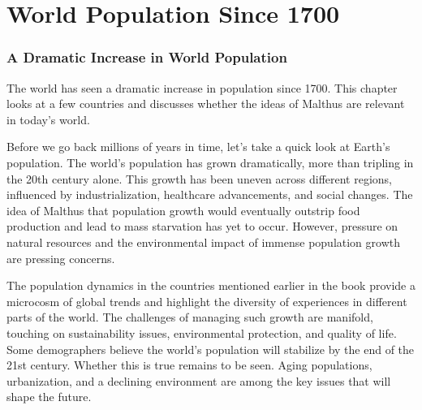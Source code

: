 \documentclass{book}
\newcommand{\inputtoc}[1]{}
\begin{document}
\chapter{World Population Since 1700}
\subsection*{A Dramatic Increase in World Population}
The world has seen a dramatic increase in population since 1700. This chapter looks at a few countries and discusses whether the ideas of Malthus are relevant in today's world.

\let\oldsection\section
\renewcommand{\section}[1]{\oldsection*{#1}\addcontentsline{toc}{section}{#1}}



Before we go back millions of years in time, let's take a quick look at Earth's population. The world's population has grown dramatically, more than tripling in the 20th century alone. This growth has been uneven across different regions, influenced by industrialization, healthcare advancements, and social changes. The idea of Malthus that population growth would eventually outstrip food production and lead to mass starvation has yet to occur. However, pressure on natural resources and the environmental impact of immense population growth are pressing concerns.

\inputtoc{england.tex}
\inputtoc{germany.tex}
\inputtoc{turkey.tex}
\inputtoc{SouthAfrica.tex}
\inputtoc{brazil.tex}
\inputtoc{russia.tex}
\inputtoc{australia.tex}
\inputtoc{korea.tex}
\inputtoc{japan.tex}
\inputtoc{indonesia.tex}
\inputtoc{india.tex}
\inputtoc{china.tex}
\inputtoc{mexico.tex}
\inputtoc{canada.tex}
\inputtoc{usa.tex}

\let\section\oldsection

The population dynamics in the countries mentioned earlier in the book provide a microcosm of global trends and highlight the diversity of experiences in different parts of the world. The challenges of managing such growth are manifold, touching on sustainability issues, environmental protection, and quality of life. Some demographers believe the world's population will stabilize by the end of the 21st century. Whether this is true remains to be seen. Aging populations, urbanization, and a declining environment are among the key issues that will shape the future. 
\end{document}
